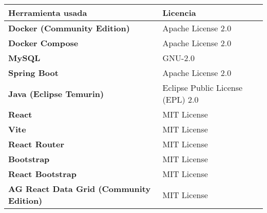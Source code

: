 \begin{table}[p]
\centering
	\begin{tabularx}{\linewidth}{ p{} p{} }
\toprule
\textbf{Herramienta usada}                      & \textbf{Licencia}                                                                                                                   \\ \toprule
\textbf{Docker (Community Edition)}             & Apache License 2.0                                                                                                         \\
\textbf{Docker Compose}                         & Apache License 2.0                                                                                                         \\
\textbf{MySQL}                                  & GNU-2.0                                                                                                                    \\
\textbf{Spring Boot}                            & Apache License 2.0                                                                                                         \\
\textbf{Java (Eclipse Temurin)}                 & Eclipse Public License (EPL) 2.0                                                                                           \\
\textbf{React}                                  & MIT License                                                                                                                \\
\textbf{Vite}                                   & MIT License                                                                                                                \\
\textbf{React Router}                           & MIT License                                                                                                                \\
\textbf{Bootstrap}                              & MIT License                                                                                                                \\
\textbf{React Bootstrap}                        & MIT License                                                                                                                \\
\textbf{AG React Data Grid (Community Edition)} & MIT License                                                                                                                \\

\end{tabularx}
\end{table}
